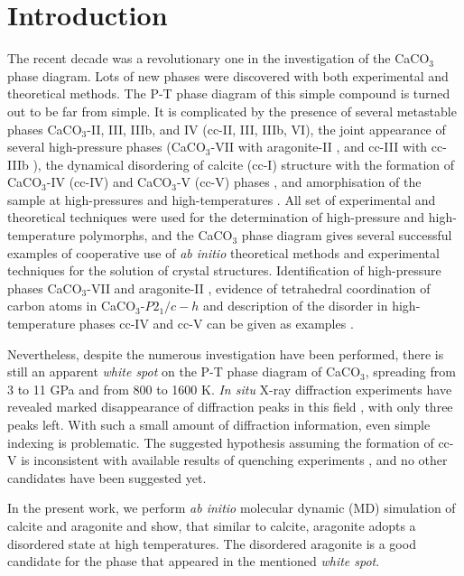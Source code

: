\documentclass[journal=jacsat,manuscript=article]{achemso}
\begin{document}
\section{Introduction}
The recent decade was a revolutionary one in the investigation of the CaCO$_3$ phase diagram. 
Lots of new phases were discovered with both experimental and theoretical methods. 
The P-T phase diagram of this simple compound is turned out to be far from simple. It is complicated by the presence of several metastable phases CaCO$_3$-II, III, IIIb, and IV (cc-II, III, IIIb, VI), the joint appearance of several high-pressure phases (CaCO$_3$-VII with aragonite-II \cite{gavr2017_aragII}, and cc-III with cc-IIIb \cite{merlini2014}), the dynamical disordering of calcite (cc-I) structure with the formation of CaCO$_3$-IV (cc-IV) and CaCO$_3$-V (cc-V) phases \cite{ishizawa2013, dove2005}, and amorphisation of the sample at high-pressures and high-temperatures \cite{hou2019_amorph}. 
All set of experimental and theoretical techniques were used for the determination of high-pressure and high-temperature polymorphs, and the CaCO$_3$ phase diagram gives several successful examples of cooperative use of {\it ab initio} theoretical methods and experimental techniques for the solution of crystal structures. 
Identification of high-pressure phases CaCO$_3$-VII and aragonite-II \cite{gavr2017_aragII, smith2018}, evidence of tetrahedral coordination of carbon atoms in CaCO$_3$-$P2_1/c-h$ \cite{lobanov2017} and description of the disorder in high-temperature phases cc-IV and cc-V can be given as examples \cite{dove2005}.

Nevertheless, despite the numerous investigation have been performed, there is still an apparent {\it white spot} on the P-T phase diagram of CaCO$_3$, spreading from 3 to 11 GPa and from 800 to 1600 K. 
{\it In situ} X-ray diffraction experiments have revealed marked disappearance of diffraction peaks in this field \cite{suito2001, litasov2017}, with only three peaks left. 
With such a small amount of diffraction information, even simple indexing is problematic. 
The suggested hypothesis assuming the formation of cc-V \cite{suito2001} is inconsistent with available results of quenching experiments \cite{shatskiy2014_feco3}, and no other candidates have been suggested yet. 


In the present work, we perform {\it ab initio} molecular dynamic (MD) simulation of calcite and aragonite and show, that similar to calcite, aragonite adopts a disordered state at high temperatures. The disordered aragonite is a good candidate for the phase that appeared in the mentioned {\it white spot}.
\end{document}
